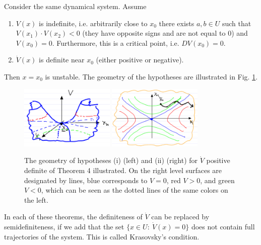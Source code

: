 \begin{theorem}[Theorem 4]
	Consider the same dynamical system. Assume
	\begin{enumerate}
		\item $V(x)$ is indefinite, i.e. arbitrarily close to $x_0$ there exists $a,b \in U$ such that $V(x_1)\cdot V(x_2) <0$ (they have opposite signs and are not equal to 0) and $V(x_0)=0$. Furthermore, this is a critical point, i.e. $DV(x_0)=0$.
		\item $\dot{V}(x)$ is definite near $x_0$ (either positive or negative).
	\end{enumerate}
	Then $x=x_0$ is unstable. The geometry of the hypotheses are  illustrated in Fig. \ref{fig:lyap_thm4_hypos}.
\end{theorem}

\begin{figure}[h!]
	\centering
	\includegraphics[width=0.4\textwidth]{figures/ch2/26lyap_thm4_hypos.png}
	\hspace{0.05\textwidth}
	\includegraphics[width=0.4\textwidth]{figures/ch2/26lyap_thm4_hypos2.png}
	\caption{The geometry of hypotheses (i) (left) and (ii) (right) for $\dot{V}$ positive definite of Theorem 4 illustrated. On the right level surfaces are designated by lines, blue corresponds to $V=0$, red $V>0$, and green $V<0$, which can be seen as the dotted lines of the same colors on the left.}
	\label{fig:lyap_thm4_hypos}
\end{figure}

\begin{remark}[]
	In each of these theorems, the definiteness of $ \dot{V}$ can be replaced by semidefiniteness, if we add that the set $\{x\in U:\ \dot{V}(x)=0 \}$ does not contain full trajectories of the system. This is called Krasovsky's condition.
\end{remark}

